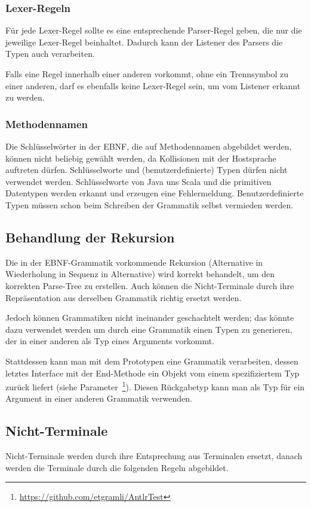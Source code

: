 \documentclass[../InterneDSLs.tex]{subfiles}
\begin{document}
\subsubsection{Lexer-Regeln}
Für jede Lexer-Regel sollte es eine entsprechende Parser-Regel geben, die nur die jeweilige Lexer-Regel beinhaltet. Dadurch kann der Listener des Parsers die Typen auch verarbeiten.

Falls eine Regel innerhalb einer anderen vorkommt, ohne ein Trennsymbol zu einer anderen, darf es ebenfalls keine Lexer-Regel sein, um vom Listener erkannt zu werden.

\subsubsection{Methodennamen}
Die Schlüsselwörter in der EBNF, die auf Methodennamen abgebildet werden, können nicht beliebig gewählt werden, da Kollisionen mit der Hostsprache auftreten dürfen. Schlüsselworte und (benutzerdefinierte) Typen dürfen nicht verwendet werden. Schlüsselworte von Java uns Scala und die primitiven Datentypen werden erkannt und erzeugen eine Fehlermeldung. Benutzerdefinierte Typen müssen schon beim Schreiben der Grammatik selbst vermieden werden.


\subsection{Behandlung der Rekursion}
Die in der EBNF-Grammatik vorkommende Rekursion (Alternative in Wiederholung in Sequenz in Alternative) wird korrekt behandelt, um den korrekten Parse-Tree zu erstellen. Auch können die Nicht-Terminale durch ihre Repräsentation aus derselben Grammatik richtig ersetzt werden.

Jedoch können Grammatiken nicht ineinander geschachtelt werden; das könnte dazu verwendet werden um durch eine Grammatik einen Typen zu generieren, der in einer anderen als Typ eines Arguments vorkommt.

Stattdessen kann man mit dem Prototypen eine Grammatik verarbeiten, dessen letztes Interface mit der End-Methode ein Objekt vom einem spezifiziertem Typ zurück liefert (siehe Parameter~\footnote{\url{https://github.com/etgramli/AntlrTest}}). Diesen Rückgabetyp kann man als Typ für ein Argument in einer anderen Grammatik verwenden.

\subsection{Nicht-Terminale}
Nicht-Terminale werden durch ihre Entsprechung aus Terminalen ersetzt, danach werden die Terminale durch die folgenden Regeln abgebildet.
\end{document}
